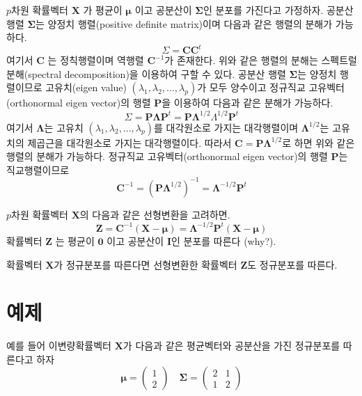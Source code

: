 \documentclass[
]{book}
\theoremstyle{definition}
\theoremstyle{definition}
\theoremstyle{definition}
\theoremstyle{remark}
\begin{document}
\(p\)차원 확률벡터 \(\bm X\) 가 평균이 \(\bm \mu\) 이고 공분산이 \(\bm \Sigma\)인 분포를 가진다고 가정하자.
공분산 행렬 \(\bm \Sigma\)는 양정치 행렬(positive definite matrix)이며 다음과 같은 행렬의 분해가 가능하다.
\[ \Sigma = \bm C \bm C^t \]
여기서 \(\bm C\) 는 정칙행렬이며 역행렬 \(\bm C^{-1}\)가 존재한다.
위와 같은 행렬의 분해는 스펙트럴 분해(spectral decomposition)을 이용하여 구할 수 있다. 공분산 행렬 \(\bm \Sigma\)는 양정치 행렬이므로 고유치(eigen value) \((\lambda_1, \lambda_2,\dots, \lambda_p)\)가 모두 양수이고 정규직교 고유벡터(orthonormal eigen vector)의 행렬 \(\bm P\)을 이용하여 다음과 같은 분해가 가능하다.
\[ \Sigma = \bm P \bm \Lambda \bm P^t = \bm P \bm \Lambda^{1/2} \Lambda^{1/2} \bm P^t \]
여기서 \(\bm \Lambda\)는 고유치 \((\lambda_1, \lambda_2,\dots, \lambda_p)\)를 대각원소로 가지는
대각행렬이며 \(\bm \Lambda^{1/2}\)는 고유치의 제곱근을 대각원소로 가지는
대각행렬이다. 따라서 \(\bm C = \bm P \bm \Lambda^{1/2}\)로 하면 위와 같은 행렬의 분해가 가능하다.
정규직교 고유벡터(orthonormal eigen vector)의 행렬 \(\bm P\)는 직교행렬이므로
\[ \bm C^{-1} =  (\bm P \bm \Lambda^{1/2})^{-1} = \bm \Lambda^{-1/2} \bm P^t \]

\(p\)차원 확률벡터 \(\bm X\)의 다음과 같은 선형변환을 고려하면.
\[ \bm Z = \bm C^{-1} ( \bm X- \bm \mu) = \bm \Lambda^{-1/2} \bm P^t ( \bm X- \bm \mu)  \]
확률벡터 \(\bm Z\) 는 평균이 \(\bm 0\) 이고 공분산이 \(\bm I\)인 분포를 따른다 (why?).

확률벡터 \(\bm X\)가 정규분포를 따른다면 선형변환한 확률벡터 \(\bm Z\)도 정규분포를 따른다.

\hypertarget{uxc608uxc81c}{%
\section{예제}\label{uxc608uxc81c}}

예를 들어 이변량확률벡터 \(\bm X\)가 다음과 같은 평균벡터와 공분산을 가진 정규분포를 따른다고 하자
\begin{equation*}
\bm \mu =
  \begin{pmatrix}
1\\
2
\end{pmatrix}
\quad
\bm \Sigma =
  \begin{pmatrix}
2 & 1\\
1 & 2
\end{pmatrix}
\end{equation*}
\end{document}

